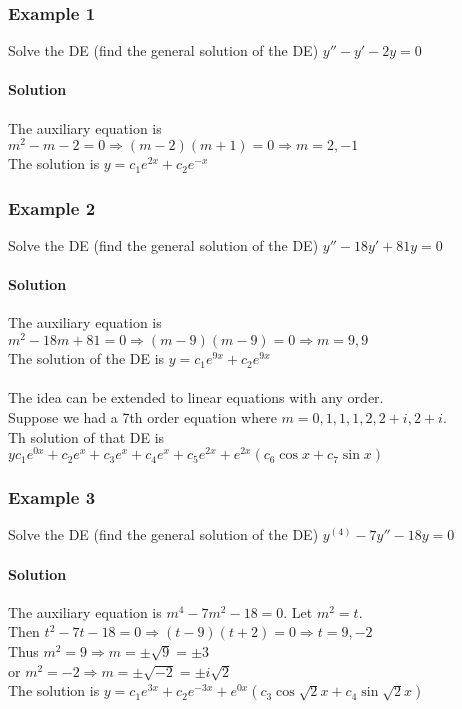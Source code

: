 \documentclass{article}
\begin{document}
\subsubsection{Example 1}
Solve the DE (find the general solution of the DE) $y''-y'-2y=0$
\paragraph{Solution} The auxiliary equation is $m^2-m-2=0\Rightarrow(m-2)(m+1)=0\Rightarrow m=2,-1$
\\The solution is $y=c_1e^{2x}+c_2e^{-x}$

\subsubsection{Example 2}
Solve the DE (find the general solution of the DE) $y''-18y'+81y=0$
\paragraph{Solution} The auxiliary equation is $m^2-18m+81=0\Rightarrow (m-9)(m-9)=0\Rightarrow m=9,9$
\\The solution of the DE is $y=c_1e^{9x}+c_2e^{9x}$
\\\\The idea can be extended to linear equations with any order.
\\Suppose we had a 7th order equation where $m=0,1,1,1,2,2+i,2+i$.
\\Th solution of that DE is $yc_1e^{0x}+c_2e^x+c_3e^x+c_4e^x+c_5e^{2x}+e^{2x}(c_6\cos{x}+c_7\sin{x})$

\subsubsection{Example 3}
Solve the DE (find the general solution of the DE) $y^{(4)}-7y''-18y=0$
\paragraph{Solution} The auxiliary equation is $m^4-7m^2-18=0$. Let $m^2=t$.
\\Then $t^2-7t-18=0\Rightarrow(t-9)(t+2)=0\Rightarrow t=9,-2$
\\Thus $m^2=9\Rightarrow m=\pm\sqrt{9}=\pm3$
\\or $m^2=-2\Rightarrow m=\pm\sqrt{-2}=\pm i\sqrt{2}$
\\The solution is $y=c_1e^{3x}+c_2e^{-3x}+e^{0x}(c_3\cos\sqrt{2}x+c_4\sin\sqrt{2}x)$
\end{document}

